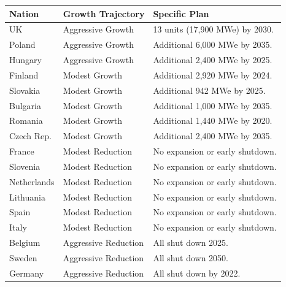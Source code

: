 \begin{table}[h]
    \centering
        \begin{tabularx}{\textwidth}{lmb}
            \hline 
                    
                    \textbf{Nation} & \textbf{Growth Trajectory} & \textbf{Specific Plan }\\
                    \hline
                    UK & Aggressive Growth & {\small  13 units (17,900 \gls{MWe}) by 2030.}\\
                    \hline
                    Poland & Aggressive Growth &  {\small Additional 6,000 \gls{MWe} by 2035.}\\
                    \hline
                    Hungary & Aggressive Growth &  {\small Additional 2,400 \gls{MWe} by 2025.} \\ 
                    \hline
                    Finland & Modest Growth &  {\small Additional 2,920 \gls{MWe} by 2024.}\\
                    \hline
                    Slovakia & Modest Growth & {\small Additional 942 \gls{MWe} by 2025.}\\
                    \hline
                    Bulgaria & Modest Growth &  {\small Additional 1,000 \gls{MWe} by 2035.} \\
                    \hline
                    Romania & Modest Growth &  {\small Additional 1,440 \gls{MWe} by 2020.} \\
                    \hline
                    Czech Rep. & Modest Growth & {\small  Additional 2,400 \gls{MWe} by 2035.}\\
                    \hline
                    France & Modest Reduction & {\small No expansion or early shutdown.}\\
                    \hline
                    Slovenia & Modest Reduction & {\small No expansion or early shutdown.}\\
                    \hline
                    Netherlands & Modest Reduction & {\small No expansion or early shutdown.}\\
                    \hline
                    Lithuania & Modest Reduction & {\small No expansion or early shutdown.}\\
                    \hline 
                    Spain & Modest Reduction &  {\small No expansion or early shutdown.} \\
                    \hline
                    Italy & Modest Reduction & {\small No expansion or early shutdown. }\\
                    \hline
                    Belgium & Aggressive Reduction & All shut down 2025.\\
                    \hline
                    Sweden & Aggressive Reduction & All shut down 2050.\\
                    \hline
                    Germany & Aggressive Reduction & All shut down by 2022.\\
                    \hline
                    

\end{tabularx}
\end{table}
